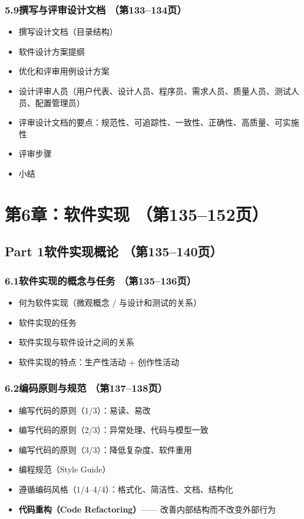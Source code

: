 \documentclass[12pt,a4paper]{ctexart}
\begin{document}
\subsubsection{5.9\quad 撰写与评审设计文档 \hfill（第133--134页）}
\begin{itemize}
    \item 撰写设计文档（目录结构）
    \item 软件设计方案提纲
    \item 优化和评审用例设计方案
    \item 设计评审人员（用户代表、设计人员、程序员、需求人员、质量人员、测试人员、配置管理员）
    \item 评审设计文档的要点：规范性、可追踪性、一致性、正确性、高质量、可实施性
    \item 评审步骤
    \item 小结
\end{itemize}

\vspace{0.3cm}
\section{第6章：软件实现 \hfill（第135--152页）}

\subsection{Part 1\quad 软件实现概论 \hfill（第135--140页）}

\subsubsection{6.1\quad 软件实现的概念与任务 \hfill（第135--136页）}
\begin{itemize}
    \item 何为软件实现（微观概念 / 与设计和测试的关系）
    \item 软件实现的任务
    \item 软件实现与软件设计之间的关系
    \item 软件实现的特点：生产性活动 + 创作性活动
\end{itemize}

\subsubsection{6.2\quad 编码原则与规范 \hfill（第137--138页）}
\begin{itemize}
    \item 编写代码的原则（1/3）：易读、易改
    \item 编写代码的原则（2/3）：异常处理、代码与模型一致
    \item 编写代码的原则（3/3）：降低复杂度、软件重用
    \item 编程规范（Style Guide）
    \item 遵循编码风格（1/4--4/4）：格式化、简洁性、文档、结构化
    \item \textbf{代码重构（Code Refactoring）}—— 改善内部结构而不改变外部行为
\end{itemize}
\end{document}
